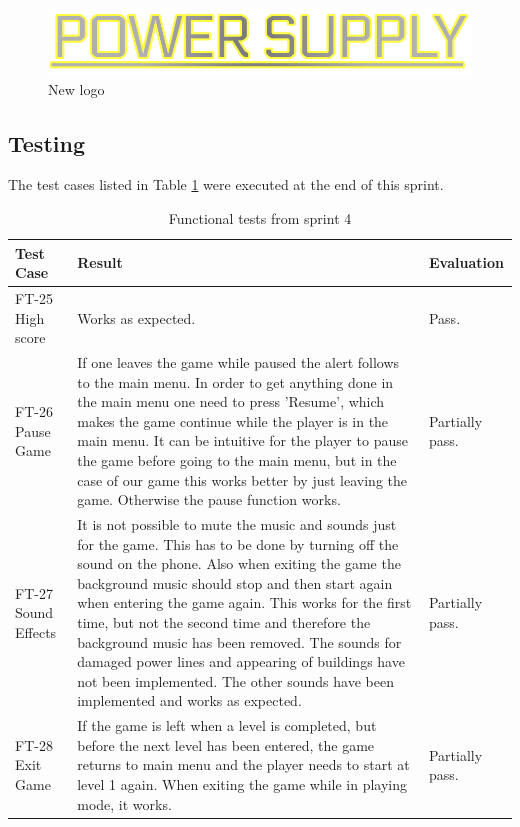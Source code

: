 		\begin{figure}
			\centering
			\includegraphics[scale=0.4]{pictures/newLogo.png}
			\caption{New logo}
		\end{figure}


\subsection{Testing}

	The test cases listed in Table \ref{table:testssprint4} were executed at the end of this sprint.


	\begin{table}[H]
	\begin{tabular}{| p{3cm} | p{7cm} | p{2cm} |}
		\hline
		\rowcolor{lightgray}
		{\bf Test Case} & {\bf Result} & {\bf Evaluation} \\ \hline

		FT-25 High score & Works as expected. & Pass. \\ \hline

		FT-26 Pause Game & If one leaves the game while paused the alert follows to the main menu. In order 
		to get anything done in the main menu one need to press 'Resume', which makes the game continue while 
		the player is in the main menu. It can be intuitive for the player to pause the game before going to 
		the main menu, but in the case of our game this works better by just leaving the game. Otherwise the 
		pause function works. & Partially pass. \\ \hline

		FT-27 Sound Effects & It is not possible to mute the music and sounds just for the game. This has to 
		be done by turning off the sound on the phone. Also when exiting the game the background music should 
		stop and then start again when entering the game again. This works for the first time, but not the 
		second time and therefore the background music has been removed. The sounds for damaged power lines and appearing of buildings have not been implemented. The other sounds have been implemented and works as expected. & Partially pass. \\ \hline

		FT-28 Exit Game & If the game is left when a level is completed, but before the next level has been 
		entered, the game returns to main menu and the player needs to start at level 1 again. When exiting 
		the game while in playing mode, it works. & Partially pass. \\ \hline

	\end{tabular}
	\caption{Functional tests from sprint 4}
	\label{table:testssprint4}
	\end{table}

